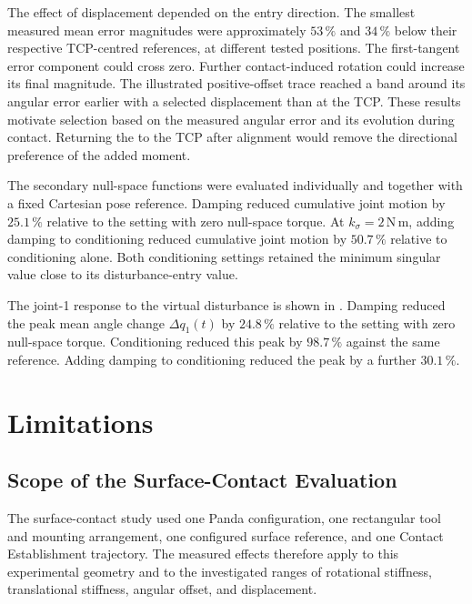 The effect of  displacement depended on the entry direction.
The smallest measured mean error magnitudes were approximately
\mbox{\(53\,\%\)} and \mbox{\(34\,\%\)} below their respective TCP-centred
references, at different tested positions.
The first-tangent error component could cross zero.
Further contact-induced rotation could increase its final magnitude.
The illustrated positive-offset trace reached a band around its angular error
earlier with a selected displacement than at the TCP.
These results motivate selection based on the measured angular error and its
evolution during contact. Returning the  to the TCP after alignment
would remove the directional preference of the added moment.

The secondary null-space functions were evaluated individually and together
with a fixed Cartesian pose reference. Damping reduced cumulative
joint motion by \mbox{\(25.1\,\%\)} relative to the setting with zero
null-space torque.
At \mbox{\(k_\sigma=2\,\mathrm{N\,m}\)}, adding damping to conditioning
reduced cumulative joint motion by \mbox{\(50.7\,\%\)} relative to
conditioning alone. Both conditioning settings retained the minimum singular
value close to its disturbance-entry value.

The joint-1 response to the virtual disturbance is shown in
.
Damping reduced the peak mean angle change \mbox{\(\Delta q_1(t)\)} by
\mbox{\(24.8\,\%\)} relative to the setting with zero null-space torque.
Conditioning reduced this peak by \mbox{\(98.7\,\%\)} against the same reference.
Adding damping to conditioning reduced the peak by a further
\mbox{\(30.1\,\%\)}.

\section{Limitations}
\label{sec:limitations}

\subsection{Scope of the Surface-Contact Evaluation}
\label{subsec:conclusion_experimental_range}

\begingroup
{}
The surface-contact study used one Panda configuration, one rectangular tool
and mounting arrangement, one configured surface reference, and one Contact
Establishment trajectory. The measured effects therefore apply to this
experimental geometry and to the investigated ranges of rotational stiffness,
translational stiffness, angular offset, and  displacement.
\par\endgroup

